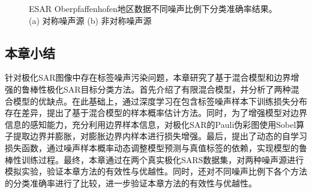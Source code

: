 \begin{figure}[ht!]
  \caption{ESAR Oberpfaffenhofen地区数据不同噪声比例下分类准确率结果。(a) 对称噪声源 (b) 非对称噪声源}
  \label{fig:ober_noise}
\end{figure}

\subsection{本章小结}
针对极化SAR图像中存在标签噪声污染问题，本章研究了基于混合模型和边界增强的鲁棒性极化SAR目标分类方法。首先介绍了有限混合模型，并分析了两种混合模型的优缺点。在此基础上，通过深度学习在包含标签噪声样本下训练损失分布存在差异，提出了基于混合模型的样本概率估计方法。同时，为了增强模型对边界信息的感知能力，充分利用边界样本信息，对极化SAR的Pauli伪彩图使用Sobel算子提取边界并膨胀，对膨胀边界内样本进行损失增强。最后，提出了动态的自学习损失函数，通过噪声样本概率动态调整模型预测与真值标签的依赖，实现模型的鲁棒性训练过程。最终，本章通过在两个真实极化SARS数据集，对两种噪声源进行模拟实验，验证本章方法的有效性与优越性。同时，还对不同噪声比例下各个方法的分类准确率进行了比较，进一步验证本章方法的有效性与优越性。